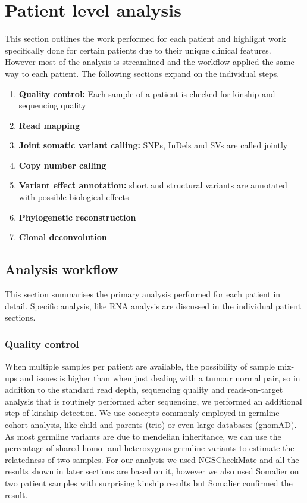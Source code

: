 \section{Patient level analysis}
\label{cascade-sec:patientLevel}
This section outlines the work performed for each patient and highlight work specifically done for certain patients due to their unique clinical features. However most of the analysis is streamlined and the workflow applied the same way to each patient. The following sections expand on the individual steps.
\begin{enumerate}
\item \textbf{Quality control:} Each sample of a patient is checked for kinship and sequencing quality
\item \textbf{Read mapping}
\item \textbf{Joint somatic variant calling:} SNPs, InDels and SVs are called jointly
\item \textbf{Copy number calling}
\item \textbf{Variant effect annotation:} short and structural variants are annotated with possible biological effects
\item \textbf{Phylogenetic reconstruction}
\item \textbf{Clonal deconvolution}
\end{enumerate}


\subsection{Analysis workflow}
\label{cascade-sec:workflow}
This section summarises the primary analysis performed for each patient in detail. Specific analysis, like RNA analysis are discussed in the individual patient sections. 

\subsubsection{Quality control}
\label{cascade-sec:qc}
When multiple samples per patient are available, the possibility of sample mix-ups and issues is higher than when just dealing with a tumour normal pair, so in addition to the standard read depth, sequencing quality and reads-on-target analysis that is routinely performed after sequencing, we performed an additional step of kinship detection. We use concepts commonly employed in germline cohort analysis, like child and parents (trio) or even large databases (gnomAD). As most germline variants are due to mendelian inheritance, we can use the percentage of shared homo- and heterozygous germline variants to estimate the relatedness of two samples. For our analysis we used NGSCheckMate \cite{Lee2017} and all the results shown in later sections are based on it, however we also used Somalier \cite{Pedersen2020} on two patient samples with surprising kinship results but Somalier confirmed the result.

